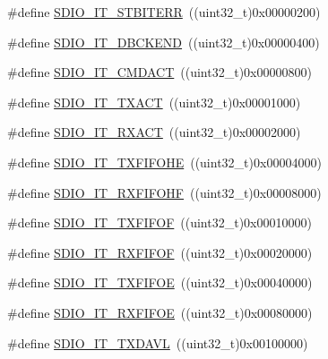 \begin{DoxyCompactItemize}
\item 
\#define \mbox{\hyperlink{group___s_d_i_o___interrupt__sources_ga55f7e65ed1b70d5a6abdc3cc41b55766}{S\+D\+I\+O\+\_\+\+I\+T\+\_\+\+S\+T\+B\+I\+T\+E\+RR}}~((uint32\+\_\+t)0x00000200)
\item 
\#define \mbox{\hyperlink{group___s_d_i_o___interrupt__sources_gaa1b1fb453a3ce3b10928aaeada2b2186}{S\+D\+I\+O\+\_\+\+I\+T\+\_\+\+D\+B\+C\+K\+E\+ND}}~((uint32\+\_\+t)0x00000400)
\item 
\#define \mbox{\hyperlink{group___s_d_i_o___interrupt__sources_gae73ae9bc72eaeedc2a37221697bc33e2}{S\+D\+I\+O\+\_\+\+I\+T\+\_\+\+C\+M\+D\+A\+CT}}~((uint32\+\_\+t)0x00000800)
\item 
\#define \mbox{\hyperlink{group___s_d_i_o___interrupt__sources_ga811e683588ab887abb0101defafdb51e}{S\+D\+I\+O\+\_\+\+I\+T\+\_\+\+T\+X\+A\+CT}}~((uint32\+\_\+t)0x00001000)
\item 
\#define \mbox{\hyperlink{group___s_d_i_o___interrupt__sources_ga1d9a59a2415b57bdf9827423cb6ce3a0}{S\+D\+I\+O\+\_\+\+I\+T\+\_\+\+R\+X\+A\+CT}}~((uint32\+\_\+t)0x00002000)
\item 
\#define \mbox{\hyperlink{group___s_d_i_o___interrupt__sources_gaf538ae7dd73d55e76069e8710858038a}{S\+D\+I\+O\+\_\+\+I\+T\+\_\+\+T\+X\+F\+I\+F\+O\+HE}}~((uint32\+\_\+t)0x00004000)
\item 
\#define \mbox{\hyperlink{group___s_d_i_o___interrupt__sources_gadcbc1a0de8b9df83b5c6c839b4739c87}{S\+D\+I\+O\+\_\+\+I\+T\+\_\+\+R\+X\+F\+I\+F\+O\+HF}}~((uint32\+\_\+t)0x00008000)
\item 
\#define \mbox{\hyperlink{group___s_d_i_o___interrupt__sources_ga3ec471bd9233561d6e929ebac6362b75}{S\+D\+I\+O\+\_\+\+I\+T\+\_\+\+T\+X\+F\+I\+F\+OF}}~((uint32\+\_\+t)0x00010000)
\item 
\#define \mbox{\hyperlink{group___s_d_i_o___interrupt__sources_gae60a1d8e5a7caff85d84e513b093b8a8}{S\+D\+I\+O\+\_\+\+I\+T\+\_\+\+R\+X\+F\+I\+F\+OF}}~((uint32\+\_\+t)0x00020000)
\item 
\#define \mbox{\hyperlink{group___s_d_i_o___interrupt__sources_gabff1466c2f2effbe30b80a11c132d7c0}{S\+D\+I\+O\+\_\+\+I\+T\+\_\+\+T\+X\+F\+I\+F\+OE}}~((uint32\+\_\+t)0x00040000)
\item 
\#define \mbox{\hyperlink{group___s_d_i_o___interrupt__sources_ga80b01aaf64c873d21bfa95e5d98d8766}{S\+D\+I\+O\+\_\+\+I\+T\+\_\+\+R\+X\+F\+I\+F\+OE}}~((uint32\+\_\+t)0x00080000)
\item 
\#define \mbox{\hyperlink{group___s_d_i_o___interrupt__sources_gac8e5744e6d977182a6fc7484a6f1195e}{S\+D\+I\+O\+\_\+\+I\+T\+\_\+\+T\+X\+D\+A\+VL}}~((uint32\+\_\+t)0x00100000)

\end{DoxyCompactItemize}
